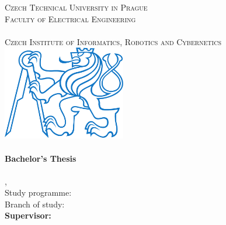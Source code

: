 
\begin{titlepage}
  \begin{center}

    \textsc{\Large Czech Technical University in Prague}\\[1em]
    \textsc{\large Faculty of Electrical Engineering\\
    \Department\\
    Czech Institute of Informatics, Robotics and Cybernetics\\[3em]
    }
    \includegraphics[height=4.1cm]{src/fig/pdfs/ctu_logo_blue.pdf}\\[3em]

    \textbf{\textsc{\Huge \Title}}\\[2em]

    \textbf{\Large Bachelor's Thesis}\\[6em]

    \textbf{\huge \Author}\\[6em]

    {\large \Location, \Date}\\[3em]

    Study programme: \Programme\\
    Branch of study: \Field\\[4em]

    \textbf{Supervisor: \Supervisor}\\

    \vspace{2pt}

  \end{center}
\end{titlepage}

